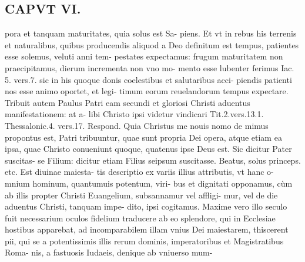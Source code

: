 \documentclass{article}
\begin{document}
\begin{pages}
\section*{CAPVT  VI. }
\marginpar{[ p.47 ]}\pstart pora et tanquam maturitates, quia solus est Sa- piens. Et vt in rebus his terrenis et naturalibus, quibus producendis aliquod a Deo definitum est tempus, patientes esse solemus, veluti anni tem- pestates expectamus: frugum maturitatem non praecipitamus, dierum incrementa non vno mo- mento esse lubenter ferimus Iac. 5. vers.7. sic in his quoque donis coelestibus et salutaribus acci- piendis patienti nos esse animo oportet, et legi- timum eorum reuelandorum tempus expectare.  \pend\pstart Tribuit autem Paulus Patri eam secundi et gloriosi Christi aduentus manifestationem: at a- libi Christo ipsi videtur vindicari Tit.2.vers.13.1. Thessalonic.4. vers.17. Respond. Quia Christus me nouis nomo de mimus propontus est, Patri tribuuntur, quae sunt propria Dei opera, atque etiam ea ipsa, quae Christo conueniunt quoque, quatenus ipse Deus est. Sic dicitur Pater suscitas- se Filium: dicitur etiam Filius seipsum suscitasse.  \pend\pstart Beatus, solus princeps. etc. Est diuinae maiesta- tis descriptio ex variis illius attributis, vt hanc o- mnium hominum, quantumuis potentum, viri- bus et dignitati opponamus, cùm ab illis propter Christi Euangelium, subsannamur vel affligi- mur, vel de die aduentus Christi, tanquam impe- dito, ipsi cogitamus. Maxime vero illo seculo fuit necessarium oculos fidelium traducere ab eo splendore, qui in Ecclesiae hostibus apparebat, ad incomparabilem illam vnius Dei maiestarem, thiscerent pii, qui se a potentissimis illis rerum dominis, imperatoribus et Magistratibus Roma- nis, a fastuosis Iudaeis, denique ab vniuerso mum-  \pend

\end{pages}
\end{document}
